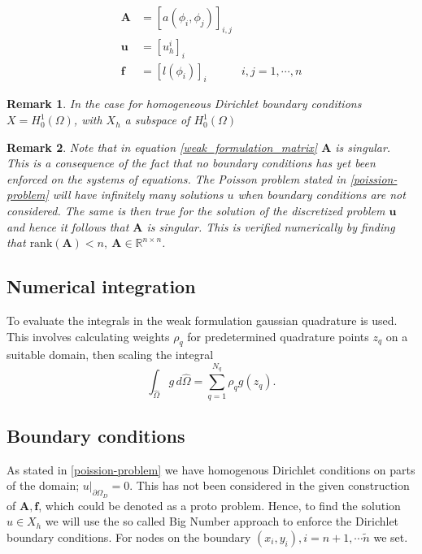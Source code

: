 \documentclass[11pt,a4paper,english]{elsarticle}%
\newcommand{\restr}[2]{\ensuremath{\left.#1\right|_{#2}}}
\newtheorem*{remark}{Remark}
\begin{document}
\begin{equation}
    \begin{aligned}
\bm A &= [a(\phi_i,\phi_j)]_{i,j}
\\ 
\bm u &= [u_h^i]_i
\\
\bm f &= [l(\phi_i)]_i & i,j = 1,\cdots,n
\end{aligned}
\end{equation}
\begin{remark}
    In the case for homogeneous Dirichlet boundary conditions $X = H_0^1(\Omega)$, with $X_h$ a subspace of $H_0^1(\Omega)$ 
\end{remark}
\begin{remark}
Note that in equation \eqref{weak_formulation_matrix} $\bm A$ is singular. 
This is a consequence of the fact that no boundary conditions has yet been enforced on the systems of equations.
The Poisson problem stated in \eqref{poission-problem} will have infinitely many solutions $u$ when boundary conditions are not considered.
The same is then true for the solution of the discretized problem $\bm u$ and hence it follows that $\bm A$ is singular.
This is verified numerically by finding that $\textrm{rank}(\bm A) < n, \ \bm A \in \mathbb{R}^{n \times n}$.
\end{remark}


\subsection{Numerical integration}
To evaluate the integrals in the weak formulation gaussian quadrature is used. This involves calculating weights $\rho_q$ for predetermined quadrature points $z_q$ on a suitable domain, then scaling the integral
\begin{equation}
    \int_{\hat{\Omega}} g \, d\hat{\Omega} = \sum_{q=1}^{N_q}{\rho_q g(z_q)}.
\end{equation}

\subsection{Boundary conditions}
As stated in \eqref{poission-problem} we have homogenous Dirichlet conditions on parts of the domain; $\restr{u}{\partial \Omega_D} =  0 $. This has not been considered in the given construction of $\bm A,\bm f$, which could be denoted as a proto problem. Hence, to find the solution $u \in X_h$ we will use the so called Big Number approach \cite[p. 16]{Lecture_Note_4} to enforce the Dirichlet boundary conditions. For nodes on the boundary $(x_i,y_i), i=n+1,\cdots\tilde n$ we set. 
\end{document}
